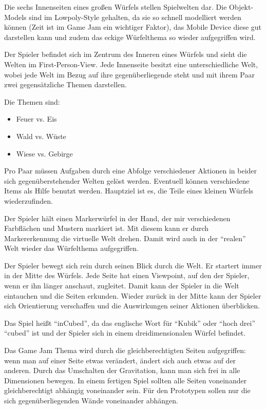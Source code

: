 
Die sechs Innenseiten eines großen Würfels stellen Spielwelten dar. Die Objekt-Models sind im Lowpoly-Style gehalten, da sie so schnell modelliert werden können (Zeit ist im Game Jam ein wichtiger Faktor), das Mobile Device diese gut darstellen kann und zudem das eckige Würfelthema so wieder aufgegriffen wird.

Der Spieler befindet sich im Zentrum des Inneren eines Würfels und sieht die Welten im First-Person-View. Jede Innenseite besitzt eine unterschiedliche Welt, wobei jede Welt im Bezug auf ihre gegenüberliegende steht und mit ihrem Paar zwei gegensätzliche Themen darstellen.    

Die Themen sind:
\begin{itemize}
\item Feuer vs. Eis
\item Wald vs. Wüste
\item Wiese vs. Gebirge
\end{itemize}

Pro Paar müssen Aufgaben durch eine Abfolge verschiedener Aktionen in beider sich gegenüberstehender Welten gelöst werden. Eventuell können verschiedene Items als Hilfe benutzt werden. Hauptziel ist es, die Teile eines kleinen Würfels wiederzufinden.

Der Spieler hält einen Markerwürfel in der Hand, der mir verschiedenen Farbflächen und Mustern markiert ist. Mit diesem kann er durch Markererkennung die virtuelle Welt drehen. Damit wird auch in der \enquote{realen} Welt wieder das Würfelthema aufgegriffen.

Der Spieler bewegt sich rein durch seinen Blick durch die Welt. Er startert immer in der Mitte des Würfels. Jede Seite hat einen Viewpoint, auf den der Spieler, wenn er ihn länger anschaut, zugleitet. Damit kann der Spieler in die Welt eintauchen und die Seiten erkunden. Wieder zurück in der Mitte kann der Spieler sich Orientierung verschaffen und die Auswirkungen seiner Aktionen überblicken.

Das Spiel heißt \enquote{inCubed}, da das englische Wort für \enquote{Kubik} oder \enquote{hoch drei} \enquote{cubed} ist und der Spieler sich in einem dreidimensionalen Würfel befindet.

Das Game Jam Thema wird durch die gleichberechtigten Seiten aufgegriffen: wenn man auf einer Seite etwas verändert, ändert sich auch etwas auf der anderen. Durch das Umschalten der Gravitation, kann man sich frei in alle Dimensionen bewegen. In einem fertigen Spiel sollten alle Seiten voneinander gleichberechtigt abhängig voneinander sein. Für den Prototypen sollen nur die sich gegenüberliegenden Wände voneinander abhängen.    